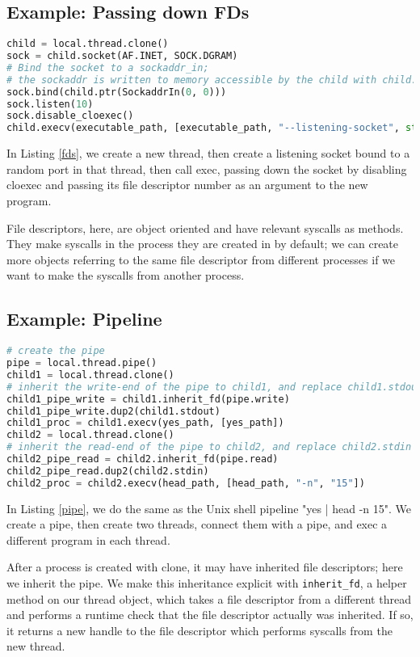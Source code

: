 \documentclass{acmart}
\begin{document}
\subsection{Example: Passing down FDs}
\begin{lstlisting}[float,language=Python,label={fds},caption={Passing down FDs}]
child = local.thread.clone()
sock = child.socket(AF.INET, SOCK.DGRAM)
# Bind the socket to a sockaddr_in;
# the sockaddr is written to memory accessible by the child with child.ptr
sock.bind(child.ptr(SockaddrIn(0, 0)))
sock.listen(10)
sock.disable_cloexec()
child.execv(executable_path, [executable_path, "--listening-socket", str(int(sock))])
\end{lstlisting}
In Listing \ref{fds}, we create a new thread,
then create a listening socket bound to a random port in that thread,
then call exec, 
passing down the socket by disabling cloexec and passing its file descriptor number as an argument to the new program.

File descriptors, here, are object oriented and have relevant syscalls as methods.
They make syscalls in the process they are created in by default;
we can create more objects referring to the same file descriptor from different processes
if we want to make the syscalls from another process.
\subsection{Example: Pipeline}
\begin{lstlisting}[float,language=Python,label={pipe},caption={Creating a pipeline}]
# create the pipe
pipe = local.thread.pipe()
child1 = local.thread.clone()
# inherit the write-end of the pipe to child1, and replace child1.stdout with it
child1_pipe_write = child1.inherit_fd(pipe.write)
child1_pipe_write.dup2(child1.stdout)
child1_proc = child1.execv(yes_path, [yes_path])
child2 = local.thread.clone()
# inherit the read-end of the pipe to child2, and replace child2.stdin with it
child2_pipe_read = child2.inherit_fd(pipe.read)
child2_pipe_read.dup2(child2.stdin)
child2_proc = child2.execv(head_path, [head_path, "-n", "15"])
\end{lstlisting}
In Listing \ref{pipe},
we do the same as the Unix shell pipeline "yes | head -n 15".
We create a pipe,
then create two threads,
connect them with a pipe,
and exec a different program in each thread.

After a process is created with clone,
it may have inherited file descriptors;
here we inherit the pipe.
We make this inheritance explicit with \texttt{inherit\_fd},
a helper method on our thread object,
which takes a file descriptor from a different thread
and performs a runtime check that the file descriptor actually was inherited.
If so, it returns a new handle to the file descriptor which performs syscalls from the new thread.
\end{document}
